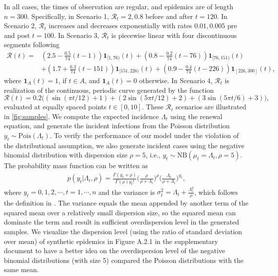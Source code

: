 \documentclass[10pt,letterpaper]{article}
\newcommand{\lr}[1]{\left(#1\right)}
\def\calR{\mathcal{R}}
\begin{document}
In all cases, the times of observation are regular, and epidemics are of
length $n=300$. Specifically, in Scenario 1, $\calR_t = 2, 0.8$ before and after
$t=120$. In Scenario 2, $\calR_t$ increases and decreases exponentially with
rates $0.01, 0.005$ pre and post $t=100$. 
In Scenario 3, $\calR_t$ is piecewise linear with four discontinuous segments following 
\begin{equation}
  \begin{split}
    \calR(t) =& \lr{2.5 - \frac{0.5}{74}\lr{t-1}} \boldsymbol{1}_{[1,76)}(t)
     + \lr{0.8 - \frac{0.2}{74}\lr{t-76}} \boldsymbol{1}_{[76,151)}(t) \\
    & + \lr{1.7 + \frac{0.3}{74}\lr{t-151}} \boldsymbol{1}_{[151,226)}(t)
       + \lr{0.9 - \frac{0.4}{74}\lr{t-226}} \boldsymbol{1}_{[226,300]}(t),
  \end{split}
\end{equation}
where $\boldsymbol{1}_{A}(t) = 1$, if $t\in A$, and $\boldsymbol{1}_{A}(t)=0$ otherwise. 
In Scenario 4, $\calR_t$ is realization of the 
continuous, periodic curve generated by the function 
\begin{equation}
  \calR(t) = 0.2 \big(\lr{\sin(\pi t/12) + 1} + \lr{2 \sin\lr{5 \pi t / 12} + 2} 
  + \lr{3 \sin(5\pi t / 6) + 3}\big),
\end{equation} 
evaluated at equally spaced points $t\in [0,10]$. 
These $\calR_t$ scenarios are illustrated in \autoref{fig:samples}.
We compute the expected incidence $\Lambda_t$
using the renewal equation, and generate the incident infections from the
Poisson distribution $y_t\sim \textrm{Pois}(\Lambda_t)$. 
To verify the performance of our model under the violation of the distributional assumption,
we also generate incident cases using the negative binomial distribution
with dispersion size $\rho=5$, i.e., $y_t\sim \textrm{NB}(\mu_t=\Lambda_t,
\rho=5)$. The probability mass function can be written as 
\begin{equation}
  \begin{split}
    p(y_t|\Lambda_t,\rho) = \frac{\Gamma(y_t+\rho)}{\Gamma(\rho)y_t!} \Big(\frac{\rho}{\rho+\Lambda_t}\Big)^{\rho} \Big(\frac{\Lambda_t}{\rho+\Lambda_t}\Big)^{y_t},  
  \end{split}
\end{equation}
where $y_t = 0,1,2,\cdots, t=1,\cdots,n$ and the variance is
 $\sigma_t^2 = \Lambda_t + \frac{\Lambda_t^2}{\rho}$, which follows the 
 definition in \cite{gressani2022epilps}.
The variance equals the mean appended by another term of the squared mean over a
relatively small dispersion size, so the squared mean can dominate the term and
result in sufficient overdispersion level in the generated samples. 
We visualize the dispersion level (using the ratio of standard deviation over mean) 
of synthetic epidemics in Figure A.2.1 in the supplementary document to have a better idea on the overdispersion level 
of the negative binomial distributions (with size 5) compared the Poisson 
distributions with the same mean. 
\end{document}
